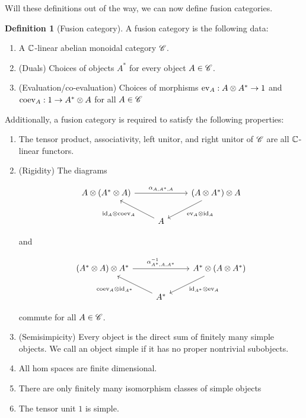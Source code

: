 \documentclass{article}
\theoremstyle{definition}
\newtheorem*{definition}{Definition}
\numberwithin{figure}{section}
\begin{document}
Will these definitions out of the way, we can now define fusion categories.

\begin{definition}[Fusion category]  A fusion category is the following data:

\begin{enumerate}
\item A $\mathbb{C}$-linear abelian monoidal category $\mathscr{C}$.
\item (Duals) Choices of objects $A^*$ for every object $A\in \mathscr{C}$.
\item (Evaluation/co-evaluation) Choices of morphisms $\mathrm{ev}_A: A\otimes A^*\to 1$ and $\mathrm{coev}_A: 1\to A^*\otimes A$ for all $A\in \mathscr{C}$
\end{enumerate}

Additionally, a fusion category is required to satisfy the following properties:

\begin{enumerate}
\item The tensor product, associativity, left unitor, and right unitor of $\mathscr{C}$ are all $\mathbb{C}$-linear functors.
\item (Rigidity) The diagrams

\[\begin{tikzcd}
	{A\otimes (A^*\otimes A)} && {(A\otimes A^*)\otimes A} \\
	& A
	\arrow["{\ev_A\otimes \id_A}", from=1-3, to=2-2]
	\arrow["{\id_A\otimes\coev_{A}}", from=2-2, to=1-1]
	\arrow["{\alpha_{A,A^*,A}}", from=1-1, to=1-3]
\end{tikzcd}\]

and

\[\begin{tikzcd}
	{(A^*\otimes A)\otimes A^*} && {A^*\otimes (A\otimes A^*)} \\
	& {A^*}
	\arrow["{\id_{A^*}\otimes\ev_A}", from=1-3, to=2-2]
	\arrow["{\coev_{A}\otimes \id_{A^*}}", from=2-2, to=1-1]
	\arrow["{\alpha^{-1}_{A^*,A,A^*}}", from=1-1, to=1-3]
\end{tikzcd}\]

commute for all $A\in \mathscr{C}$.

\item (Semisimpicity) Every object is the direct sum of finitely many simple objects. We call an object simple if it has no proper nontrivial subobjects.
\item All hom spaces are finite dimensional.
\item There are only finitely many isomorphism classes of simple objects
\item The tensor unit $1$ is simple.
\end{enumerate}
\raggedleft\qedsymbol{}
\end{definition}
\end{document}

